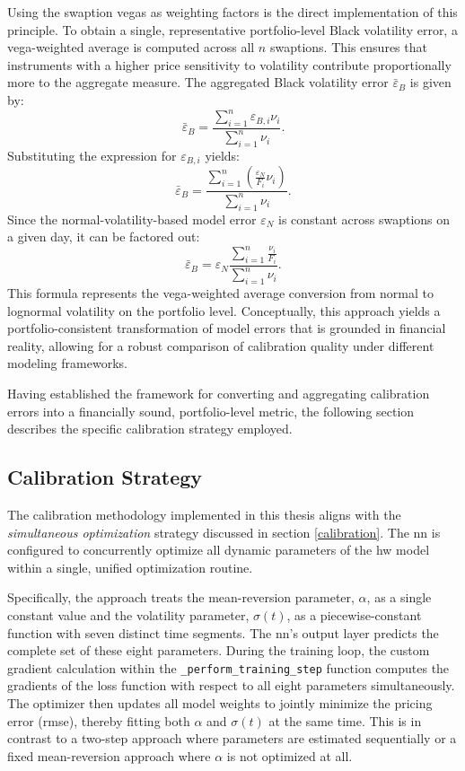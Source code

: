 Using the swaption vegas as weighting factors is the direct implementation of this principle. To obtain a single, representative portfolio-level Black volatility error, a vega-weighted average is computed across all \( n \) swaptions. This ensures that instruments with a higher price sensitivity to volatility contribute proportionally more to the aggregate measure. The aggregated Black volatility error \( \bar{\varepsilon}_B \) is given by:
\begin{equation}
	\bar{\varepsilon}_B = \frac{\sum_{i=1}^{n} \varepsilon_{B,i} \nu_i}{\sum_{i=1}^{n} \nu_i}.
\end{equation}
Substituting the expression for \( \varepsilon_{B,i} \) yields:
\begin{equation}
	\bar{\varepsilon}_B = \frac{\sum_{i=1}^{n} \left( \frac{\varepsilon_N}{F_i} \nu_i \right)}{\sum_{i=1}^{n} \nu_i}.
\end{equation}
Since the normal-volatility-based model error \( \varepsilon_N \) is constant across swaptions on a given day, it can be factored out:
\begin{equation}
	\bar{\varepsilon}_B = \varepsilon_N \frac{\sum_{i=1}^{n} \frac{\nu_i}{F_i}}{\sum_{i=1}^{n} \nu_i}.
\end{equation}
This formula represents the vega-weighted average conversion from normal to lognormal volatility on the portfolio level. Conceptually, this approach yields a portfolio-consistent transformation of model errors that is grounded in financial reality, allowing for a robust comparison of calibration quality under different modeling frameworks.

Having established the framework for converting and aggregating calibration errors into a financially sound, portfolio-level metric, the following section describes the specific calibration strategy employed.

\subsection{Calibration Strategy}
The calibration methodology implemented in this thesis aligns with the \textit{simultaneous optimization} strategy discussed in section \ref{calibration}. The \ac{nn} is configured to concurrently optimize all dynamic parameters of the \ac{hw} model within a single, unified optimization routine.

Specifically, the approach treats the mean-reversion parameter, $\alpha$, as a single constant value and the volatility parameter, $\sigma(t)$, as a piecewise-constant function with seven distinct time segments. The \ac{nn}'s output layer predicts the complete set of these eight parameters. During the training loop, the custom gradient calculation within the \texttt{\_perform\_training\_step} function computes the gradients of the loss function with respect to all eight parameters simultaneously. The optimizer then updates all model weights to jointly minimize the pricing error (\ac{rmse}), thereby fitting both $\alpha$ and $\sigma(t)$ at the same time. This is in contrast to a two-step approach where parameters are estimated sequentially or a fixed mean-reversion approach where $\alpha$ is not optimized at all.

